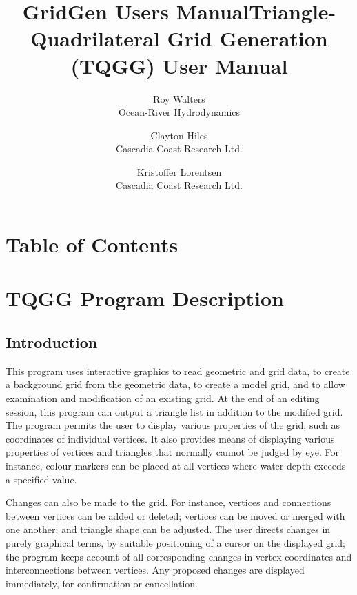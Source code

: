 \documentclass{article}
\title{GridGen Users Manual}
\begin{document}
\title{Triangle-Quadrilateral Grid Generation (TQGG) User Manual}

\author{Roy Walters \\
  Ocean-River Hydrodynamics \\
\and
  Clayton Hiles \\
  Cascadia Coast Research Ltd. \\
\and
  Kristoffer Lorentsen \\
  Cascadia Coast Research Ltd.}

\maketitle

\newpage
\section*{Table of Contents}

\setcounter{tocdepth}{2}
\tableofcontents

\newpage
\section{TQGG Program Description}

\label{bkm:Ref406485171}\label{bkm:Ref406484745}\subsection{Introduction}
This program uses interactive graphics to read geometric and grid data, to create a background grid from the geometric data, to create a model grid, and to allow examination and modification of an existing grid. At the end of an editing session, this program can output a triangle list in addition to the modified grid. The program permits the user to display various properties of the grid, such as coordinates of individual vertices. It also provides means of displaying various properties of vertices and triangles that normally cannot be judged by eye. For instance, colour markers can be placed at all vertices where water depth exceeds a specified value.

Changes can also be made to the grid. For instance, vertices and connections between vertices can be added or deleted; vertices can be moved or merged with one another; and triangle shape can be adjusted. The user directs changes in purely graphical terms, by suitable positioning of a cursor on the displayed grid; the program keeps account of all corresponding changes in vertex coordinates and interconnections between vertices. Any proposed changes are displayed immediately, for confirmation or cancellation.
\end{document}
